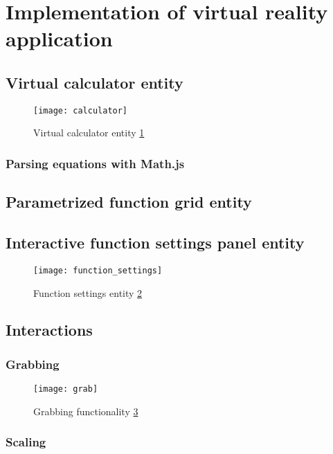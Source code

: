 \section{Implementation of virtual reality application}

\subsection{Virtual calculator entity}

\begin{figure}[ht!]
\centering
\texttt{[image: calculator]}
\caption{Virtual calculator entity \ref{r:2}}
\label{r:2}
\end{figure}

\subsubsection{Parsing equations with Math.js}

\subsection{Parametrized function grid entity}

\subsection{Interactive function settings panel entity}

\begin{figure}[ht!]
\centering
\texttt{[image: function\_settings]}
\caption{Function settings entity \ref{r:4}}
\label{r:4}
\end{figure}

\subsection{Interactions}

\subsubsection{Grabbing}

\begin{figure}[ht!]
\centering
\texttt{[image: grab]}
\caption{Grabbing functionality \ref{r:5}}
\label{r:5}
\end{figure}

\subsubsection{Scaling}

